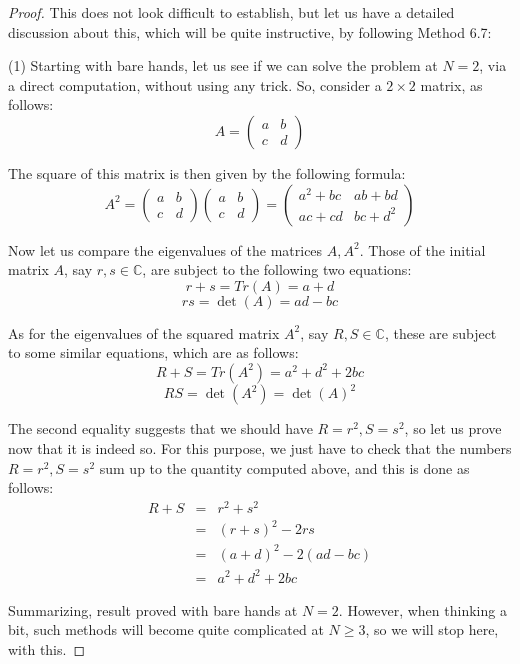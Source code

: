 \documentclass[12pt]{amsbook}
\begin{document}
\begin{proof}
This does not look difficult to establish, but let us have a detailed discussion about this, which will be quite instructive, by following Method 6.7: 

\medskip

(1) Starting with bare hands, let us see if we can solve the problem at $N=2$, via a direct computation, without using any trick. So, consider a $2\times2$ matrix, as follows:
$$A=\begin{pmatrix}
a&b\\ 
c&d
\end{pmatrix}$$

The square of this matrix is then given by the following formula:
$$A^2=\begin{pmatrix}
a&b\\ 
c&d
\end{pmatrix}\begin{pmatrix}
a&b\\ 
c&d
\end{pmatrix}
=\begin{pmatrix}
a^2+bc&ab+bd\\ 
ac+cd&bc+d^2
\end{pmatrix}$$

Now let us compare the eigenvalues of the matrices $A,A^2$. Those of the initial matrix $A$, say $r,s\in\mathbb C$, are subject to the following two equations:
$$r+s=Tr(A)=a+d$$
$$rs=\det(A)=ad-bc$$

As for the eigenvalues of the squared matrix $A^2$, say $R,S\in\mathbb C$, these are subject to some similar equations, which are as follows:
$$R+S=Tr(A^2)=a^2+d^2+2bc$$
$$RS=\det(A^2)=\det(A)^2$$

The second equality suggests that we should have $R=r^2,S=s^2$, so let us prove now that it is indeed so. For this purpose, we just have to check that the numbers $R=r^2,S=s^2$ sum up to the quantity computed above, and this is done as follows:
\begin{eqnarray*}
R+S
&=&r^2+s^2\\
&=&(r+s)^2-2rs\\
&=&(a+d)^2-2(ad-bc)\\
&=&a^2+d^2+2bc
\end{eqnarray*}

Summarizing, result proved with bare hands at $N=2$. However, when thinking a bit, such methods will become quite complicated at $N\geq3$, so we will stop here, with this.

\medskip


\end{proof}
\end{document}
